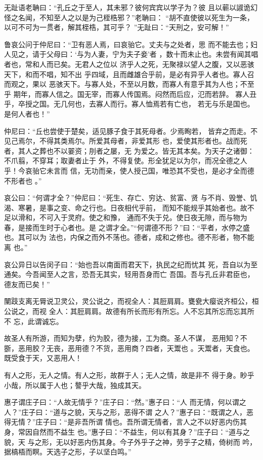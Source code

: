 \documentclass[a4paper,12pt,UTF8,twoside]{ctexbook}
\begin{document}
无趾语老聃曰：“孔丘之于至人，其未邪？彼何宾宾以学子为？彼 且以蕲以諔诡幻怪之名闻，不知至人之以是为己桎梏邪？”老聃曰： “胡不直使彼以死生为一条，以可不可为一贯者，解其桎梏，其可乎？ ”无趾曰：“天刑之，安可解！”

鲁哀公问于仲尼曰：“卫有恶人焉，曰哀骀它。丈夫与之处者，思 而不能去也；妇人见之，请于父母曰：‘与为人妻，宁为夫子妾’者 ，数十而未止也。未尝有闻其唱者也，常和人而已矣。无君人之位以 济乎人之死，无聚禄以望人之腹，又以恶骇天下，和而不唱，知不出 乎四域，且而雌雄合乎前，是必有异乎人者也。寡人召而观之，果以 恶骇天下。与寡人处，不至以月数，而寡人有意乎其为人也；不至乎 期年，而寡人信之。国无宰，而寡人传国焉。闷然而后应，氾而若辞。 寡人丑乎，卒授之国。无几何也，去寡人而行。寡人恤焉若有亡也， 若无与乐是国也。是何人者也！”

仲尼曰：“丘也尝使于楚矣，适见豚子食于其死母者。少焉眴若， 皆弃之而走。不见己焉尔，不得其类焉尔。所爱其母者，非爱其形 也，爱使其形者也。战而死者，其人之葬也不以翣资；刖者之屡，无 为爱之。皆无其本矣。为天子之诸御：不爪翦，不穿耳；取妻者止于 外，不得复使。形全犹足以为尔，而况全德之人乎！今哀骀它未言而 信，无功而亲，使人授己国，唯恐其不受也，是必才全而德不形者也 。”

哀公曰：“何谓才全？”仲尼曰：“死生、存亡、穷达、贫富、贤 与不肖、毁誉、饥渴、寒暑，是事之变、命之行也。日夜相代乎前， 而知不能规乎其始者也。故不足以滑和，不可入于灵府。使之和豫， 通而不失于兑。使日夜无隙，而与物为春，是接而生时于心者也。是 之谓才全。”“何谓德不形？”曰：“平者，水停之盛也。其可以为 法也，内保之而外不荡也。德者，成和之修也。德不形者，物不能离 也。”

哀公异日以告闵子曰：“始也吾以南面而君天下，执民之纪而忧其 死，吾自以为至通矣。今吾闻至人之言，恐吾无其实，轻用吾身而亡 吾国。吾与孔丘非君臣也，德友而已矣！”

闉跂支离无脣说卫灵公，灵公说之，而视全人：其脰肩肩。甕㼜大瘿说齐桓公，桓公说之，而视 全人：其脰肩肩。故德有所长而形有所忘。人不忘其所忘而忘其所不 忘，此谓诚忘。

故圣人有所游，而知为孽，约为胶，德为接，工为商。圣人不谋， 恶用知？不斵，恶用胶？无丧，恶用德？不货，恶用商？四者，天鬻也 。天鬻者，天食也。既受食于天，又恶用人！

有人之形，无人之情。有人之形，故群于人；无人之情，故是非不 得于身。眇乎小哉，所以属于人也；謷乎大哉，独成其天。

惠子谓庄子曰：“人故无情乎？”庄子曰：“然。”惠子曰：“人 而无情，何以谓之人？”庄子曰：“道与之貌，天与之形，恶得不谓 之人？”惠子曰：“既谓之人，恶得无情？”庄子曰：“是非吾所谓 情也。吾所谓无情者，言人之不以好恶内伤其身，常因自然而不益生 也。”惠子曰：“不益生，何以有其身？”庄子曰：“道与之貌，天 与之形，无以好恶内伤其身。今子外乎子之神，劳乎子之精，倚树而 吟，据槁梧而瞑。天选子之形，子以坚白鸣。”
\end{document}
